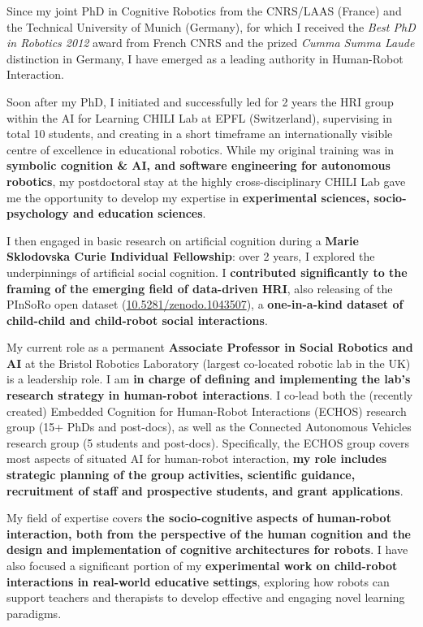 \documentclass[11pt,a4paper]{report}
\begin{document}
Since my joint PhD in Cognitive Robotics from the CNRS/LAAS (France) and the
Technical University of Munich (Germany), for which I received the \emph{Best
PhD in Robotics 2012} award from French CNRS and the prized \emph{Cumma Summa
Laude} distinction in Germany, I have emerged as a leading authority in
Human-Robot Interaction.

Soon after my PhD, I initiated and successfully led for 2 years the HRI group
within the AI for Learning CHILI Lab at EPFL (Switzerland), supervising in total
10 students, and creating in a short timeframe an internationally visible centre
of excellence in educational robotics. While my original training was in
\textbf{symbolic cognition \& AI, and software engineering for autonomous
robotics}, my postdoctoral stay at the highly cross-disciplinary CHILI Lab gave
me the opportunity to develop my expertise in \textbf{experimental sciences,
socio-psychology and education sciences}.

I then engaged in basic research on artificial cognition during a \textbf{Marie
Sklodovska Curie Individual Fellowship}: over 2 years, I explored the underpinnings of
artificial social cognition. I \textbf{contributed significantly to the framing
of the emerging field of data-driven HRI}, also releasing of the PInSoRo open
dataset (\href{https://doi.org/10.5281/zenodo.1043507}{10.5281/zenodo.1043507}),
a \textbf{one-in-a-kind dataset of child-child and child-robot social
interactions}.

My current role as a permanent \textbf{Associate Professor in Social Robotics
and AI} at the Bristol Robotics
Laboratory (largest co-located robotic lab in the UK) is a leadership role. I am
\textbf{in charge of defining and implementing the lab's research strategy in
human-robot interactions}. I co-lead both the (recently created) Embedded
Cognition for Human-Robot Interactions (ECHOS) research group (15+ PhDs and
post-docs), as well as the Connected Autonomous Vehicles research group (5
students and post-docs). Specifically, the ECHOS group covers most aspects of
situated AI for human-robot interaction, \textbf{my role includes strategic
planning of the group activities, scientific guidance, recruitment of staff and
prospective students, and grant applications}.

My field of expertise covers \textbf{the socio-cognitive aspects of
human-robot interaction, both from the perspective of the human cognition and
the design and implementation of cognitive architectures for robots}. I have
also focused a significant portion of my \textbf{experimental work on
child-robot interactions in real-world educative settings}, exploring how robots
can support teachers and therapists to develop effective and engaging novel
learning paradigms.
\end{document}
